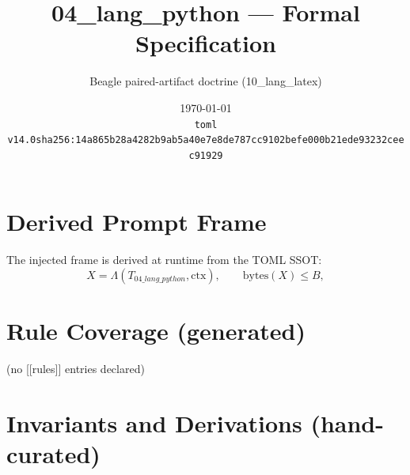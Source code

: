 \documentclass[11pt]{article}
\title{04\_lang\_python --- Formal Specification}
\author{Beagle paired-artifact doctrine (10\_lang\_latex)}
\date{\today\\ \texttt{toml v14.0\quad sha256:14a865b28a4282b9ab5a40e7e8de787cc9102befe000b21ede93232ceec91929}}
\begin{document}
\maketitle

\section{Derived Prompt Frame}
The injected frame is derived at runtime from the TOML SSOT:
\begin{equation}
  X = \Lambda(T_{04\_lang\_python}, \mathrm{ctx}), \qquad \mathrm{bytes}(X) \le B,
  \label{lbl:derive-frame}
\end{equation}

\section{Rule Coverage (generated)}
(no [[rules]] entries declared)

\section{Invariants and Derivations (hand-curated)}
\end{document}
